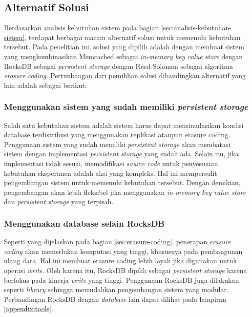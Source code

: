 \subsection{Alternatif Solusi}
\label{sec:alternatif-solusi}

Berdasarkan analisis kebutuhan sistem pada bagian \ref{sec:analisis-kebutuhan-sistem}, terdapat berbagai macam alternatif solusi untuk memenuhi kebutuhan tersebut. Pada penelitian ini, solusi yang dipilih adalah dengan membuat sistem yang mengkombinasikan Memcached sebagai \textit{in-memory key value store} dengan RocksDB sebagai \textit{persistent storage} dengan Reed-Solomon sebagai algoritma \textit{erasure coding}. Pertimbangan dari pemilihan solusi dibandingkan alternatif yang lain adalah sebagai berikut:

\subsubsection{Menggunakan sistem yang sudah memiliki \textit{persistent storage}}
Salah satu kebutuhan sistem adalah sistem harus dapat mensimulasikan kondisi database terdistribusi yang menggunakan replikasi ataupun erasure coding. Penggunaan sistem yang sudah memiliki \textit{persistent storage} akan membatasi sistem dengan implementasi \textit{persistent storage} yang sudah ada. Selain itu, jika implementasi tidak sesuai, memodifikasi \textit{source code} untuk penyesuaian kebutuhan eksperimen adalah aksi yang kompleks. Hal ini mempersulit pengembangan sistem untuk memenuhi kebutuhan tersebut. Dengan demikian, pengembangan akan lebih fleksibel jika menggunakan \textit{in-memory key value store} dan \textit{persistent storage} yang terpisah.

\subsubsection{Menggunakan database selain RocksDB}
Seperti yang dijelaskan pada bagian \ref{sec:erasure-coding}, penerapan \textit{erasure coding} akan memerlukan komputasi yang tinggi, khususnya pada pembangunan ulang data. Hal ini membuat erasure coding lebih layak jika digunakan untuk operasi \textit{write}. Oleh karena itu, RocksDB dipilih sebagai \textit{persistent storage} karena berfokus pada kinerja \textit{write} yang tinggi. Penggunaan RocksDB juga dilakukan seperti \textit{library} sehingga memudahkan pengembangan sistem yang modular. Perbandingan RocksDB dengan \textit{database} lain dapat dilihat pada lampiran \ref{appendix:tools}. 

